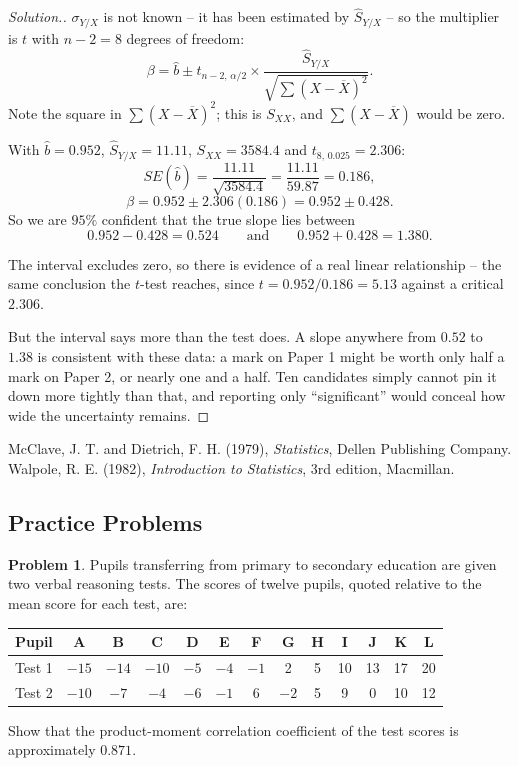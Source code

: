 \documentclass[11pt,a4paper]{article}
\theoremstyle{definition}
\newtheorem{problemx}{Problem}[section]
\newenvironment{problem}{\begin{problemx}}{\end{problemx}}
\newenvironment{solution}
  {\renewcommand{\qedsymbol}{}\begin{proof}[\textit{Solution}.]}
  {\end{proof}}
\begin{document}
\begin{solution}
$\sigma_{Y/X}$ is not known -- it has been estimated by $\hat{S}_{Y/X}$ -- so the
multiplier is $t$ with $n-2=8$ degrees of freedom:
\[\beta=\hat{b}\pm t_{n-2,\,\alpha/2}\times\frac{\hat{S}_{Y/X}}{\sqrt{\sum (X-\overline{X})^2}}.\]
Note the square in $\sum (X-\overline{X})^2$; this is $S_{XX}$, and $\sum(X-\overline{X})$
would be zero.

With $\hat{b}=0.952$, $\hat{S}_{Y/X}=11.11$, $S_{XX}=3584.4$ and
$t_{8,\,0.025}=2.306$:
\[SE(\hat{b})=\frac{11.11}{\sqrt{3584.4}}=\frac{11.11}{59.87}=0.186,\]
\[\beta=0.952\pm 2.306(0.186)=0.952\pm 0.428.\]
So we are $95\%$ confident that the true slope lies between
\[0.952-0.428=0.524 \qquad\text{and}\qquad 0.952+0.428=1.380.\]

The interval excludes zero, so there is evidence of a real linear relationship -- the same
conclusion the $t$-test reaches, since $t=0.952/0.186=5.13$ against a critical $2.306$.

But the interval says more than the test does. A slope anywhere from $0.52$ to $1.38$ is
consistent with these data: a mark on Paper 1 might be worth only half a mark on Paper 2,
or nearly one and a half. Ten candidates simply cannot pin it down more tightly than that,
and reporting only ``significant'' would conceal how wide the uncertainty remains.
\end{solution}








\pagebreak
\begin{thebibliography}{}
McClave, J. T. and Dietrich, F. H. (1979), \emph{Statistics}, Dellen Publishing Company.
Walpole, R. E. (1982), \emph{Introduction to Statistics}, 3rd edition, Macmillan.
\end{thebibliography}
\subsection{Practice Problems}

\begin{problem}
Pupils transferring from primary to secondary education are given two verbal reasoning
tests. The scores of twelve pupils, quoted relative to the mean score for each test, are:
\begin{table}[H]
\centering
\begin{tabular}{lcccccccccccc}
Pupil  & A & B & C & D & E & F & G & H & I & J & K & L\\
\hline
Test 1 & $-15$ & $-14$ & $-10$ & $-5$ & $-4$ & $-1$ & 2 & 5 & 10 & 13 & 17 & 20\\
Test 2 & $-10$ & $-7$ & $-4$ & $-6$ & $-1$ & 6 & $-2$ & 5 & 9 & 0 & 10 & 12\\
\end{tabular}
\end{table}
Show that the product-moment correlation coefficient of the test scores is approximately
$0.871$.
\end{problem}
\end{document}
